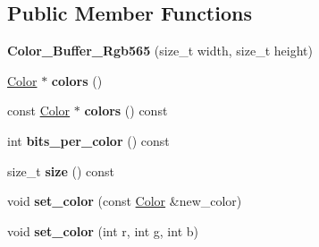 \subsection*{Public Member Functions}
\begin{DoxyCompactItemize}
\item 
\mbox{\label{class_project1__3_d_a_1_1_color___buffer___rgb565_a96e577a38f0c89ac5f6a6cba6ea94bca}} 
{\bfseries Color\+\_\+\+Buffer\+\_\+\+Rgb565} (size\+\_\+t width, size\+\_\+t height)
\item 
\mbox{\label{class_project1__3_d_a_1_1_color___buffer___rgb565_a4ebee01208d8b651a2adc4392893bb43}} 
\mbox{\hyperlink{struct_project1__3_d_a_1_1_color___buffer___rgb565_1_1_color}{Color}} $\ast$ {\bfseries colors} ()
\item 
\mbox{\label{class_project1__3_d_a_1_1_color___buffer___rgb565_a62dc1a9915df119da5901809be965291}} 
const \mbox{\hyperlink{struct_project1__3_d_a_1_1_color___buffer___rgb565_1_1_color}{Color}} $\ast$ {\bfseries colors} () const
\item 
\mbox{\label{class_project1__3_d_a_1_1_color___buffer___rgb565_a48516f1595e5941cb2743bb217b13d38}} 
int {\bfseries bits\+\_\+per\+\_\+color} () const
\item 
\mbox{\label{class_project1__3_d_a_1_1_color___buffer___rgb565_aacb9ea80f23904b73aa1fa6ec3c0c040}} 
size\+\_\+t {\bfseries size} () const
\item 
\mbox{\label{class_project1__3_d_a_1_1_color___buffer___rgb565_ab1cde5e4c5350ba90742861bff2b16a2}} 
void {\bfseries set\+\_\+color} (const \mbox{\hyperlink{struct_project1__3_d_a_1_1_color___buffer___rgb565_1_1_color}{Color}} \&new\+\_\+color)
\item 
\mbox{\label{class_project1__3_d_a_1_1_color___buffer___rgb565_a8606c39e3585c321e3368cfbab55d104}} 
void {\bfseries set\+\_\+color} (int r, int g, int b)
\item 

\end{DoxyCompactItemize}
